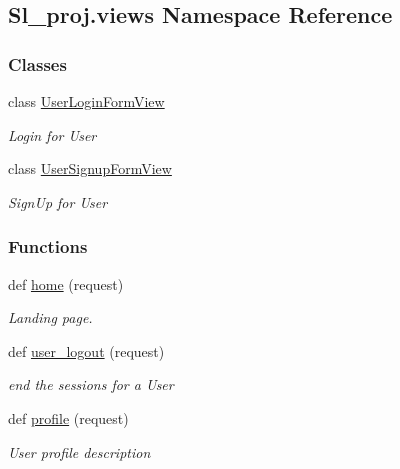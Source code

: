 \hypertarget{namespaceSl__proj_1_1views}{}\subsection{Sl\+\_\+proj.\+views Namespace Reference}
\label{namespaceSl__proj_1_1views}
\subsubsection*{Classes}
\begin{DoxyCompactItemize}
\item 
class \hyperlink{classSl__proj_1_1views_1_1UserLoginFormView}{User\+Login\+Form\+View}
\begin{DoxyCompactList}\small\item\em Login for User \end{DoxyCompactList}\item 
class \hyperlink{classSl__proj_1_1views_1_1UserSignupFormView}{User\+Signup\+Form\+View}
\begin{DoxyCompactList}\small\item\em Sign\+Up for User \end{DoxyCompactList}\end{DoxyCompactItemize}
\subsubsection*{Functions}
\begin{DoxyCompactItemize}
\item 
def \hyperlink{namespaceSl__proj_1_1views_a928e14d2a7b62a8982047413e5fbd2aa}{home} (request)
\begin{DoxyCompactList}\small\item\em Landing page. \end{DoxyCompactList}\item 
def \hyperlink{namespaceSl__proj_1_1views_ab38d32930366933823e87edb2d6d62e8}{user\+\_\+logout} (request)
\begin{DoxyCompactList}\small\item\em end the sessions for a User \end{DoxyCompactList}\item 
def \hyperlink{namespaceSl__proj_1_1views_ae1cce36a8cea71405a15f47f0e491175}{profile} (request)
\begin{DoxyCompactList}\small\item\em User profile description \end{DoxyCompactList}\end{DoxyCompactItemize}


